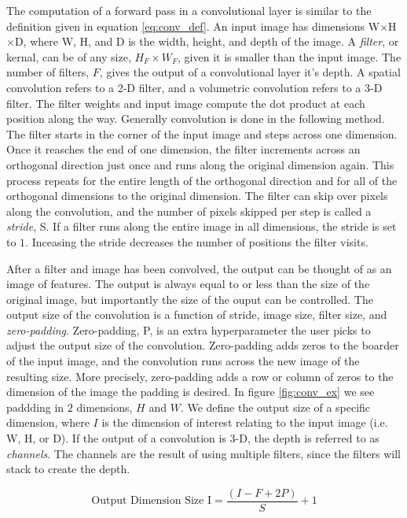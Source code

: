 \documentclass[11pt]{article}
\begin{document}
The computation of a forward pass in a convolutional layer is similar to the definition given in equation \ref{eq:conv_def}. An input image has dimensions W$\times$H$\times$D, where W, H, and D is the width, height, and depth of the image. A \emph{filter}, or kernal, can be of any size, $H_{F} \times W_{F}$, given it is smaller than the input image. The number of filters, $F$, gives the output of a convolutional layer it's depth. A spatial convolution refers to a 2-D filter, and a volumetric convolution refers to a 3-D filter. The filter weights and input image compute the dot product at each position along the way. Generally convolution is done in the following method. The filter starts in the corner of the input image and steps across one dimension. Once it reasches the end of one dimension, the filter increments across an orthogonal direction just once and runs along the original dimension again. This process repeats for the entire length of the orthogonal direction and for all of the orthogonal dimensions to the original dimension. The filter can skip over pixels along the convolution, and the number of pixels skipped per step is called a \emph{stride}, S. If a filter runs along the entire image in all dimensions, the stride is set to $1$. Inceasing the stride decreases the number of positions the filter visits.

After a filter and image has been convolved, the output can be thought of as an image of features. The output is always equal to or less than the size of the original image, but importantly the size of the ouput can be controlled. The output size of the convolution is a function of stride, image size, filter size, and \emph{zero-padding}. Zero-padding, P, is an extra hyperparameter the user picks to adjust the output size of the convolution. Zero-padding adds zeros to the boarder of the input image, and the convolution runs across the new image of the resulting size. More precisely, zero-padding adds a row or column of zeros to the dimension of the image the padding is desired. In figure \ref{fig:conv_ex} we see paddding in $2$ dimensions, $H$ and $W$. We define the output size of a specific dimension, where $I$ is the dimension of interest relating to the input image (i.e. W, H, or D). If the output of a convolution is 3-D, the depth is referred to as \emph{channels}. The channels are the result of using multiple filters, since the filters will stack to create the depth.

\begin{equation}
  \text{Output Dimension Size I} = \frac{(I - F + 2P)}{S} + 1
\end{equation}
\end{document}
